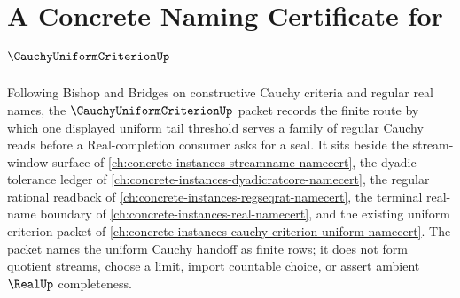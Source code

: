 \chapter{A Concrete Naming Certificate for $\CauchyUniformCriterionUp$}
\label{ch:concrete-instances-cauchy-uniform-criterion-namecert}

Following Bishop and Bridges on constructive Cauchy criteria and regular real names, the $\CauchyUniformCriterionUp$ packet records the finite route by which one displayed uniform tail threshold serves a family of regular Cauchy reads before a Real-completion consumer asks for a seal. It sits beside the stream-window surface of \autoref{ch:concrete-instances-streamname-namecert}, the dyadic tolerance ledger of \autoref{ch:concrete-instances-dyadicratcore-namecert}, the regular rational readback of \autoref{ch:concrete-instances-regseqrat-namecert}, the terminal real-name boundary of \autoref{ch:concrete-instances-real-namecert}, and the existing uniform criterion packet of \autoref{ch:concrete-instances-cauchy-criterion-uniform-namecert}. The packet names the uniform Cauchy handoff as finite rows; it does not form quotient streams, choose a limit, import countable choice, or assert ambient $\RealUp$ completeness.

